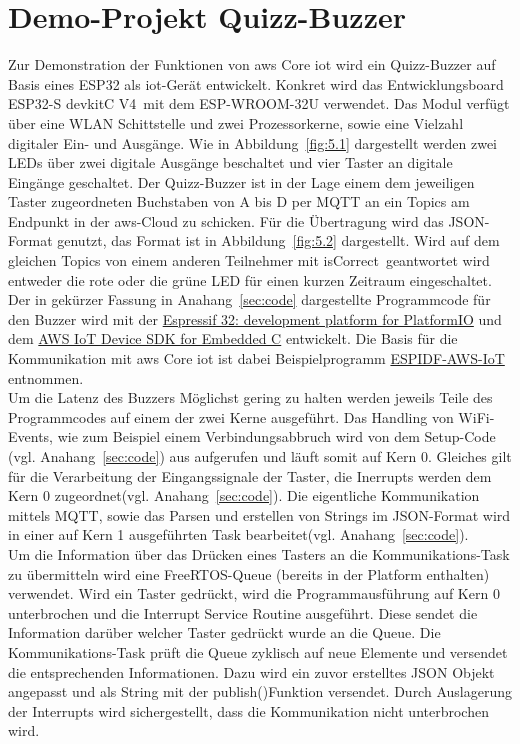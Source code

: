 \section{Demo-Projekt Quizz-Buzzer}\label{sec:5.2}
Zur Demonstration der Funktionen von \acrshort{aws} Core \acrshort{iot} wird ein Quizz-Buzzer auf Basis eines ESP32 als \acrshort{iot}-Gerät entwickelt. Konkret wird das Entwicklungsboard \glqq{}ESP32-S devkitC V4\grqq\ mit dem ESP-WROOM-32U verwendet. Das Modul verfügt über eine WLAN Schittstelle und zwei Prozessorkerne, sowie eine Vielzahl digitaler Ein- und Ausgänge. Wie in Abbildung~\ref*{fig:5.1} dargestellt werden zwei LEDs über zwei digitale Ausgänge beschaltet und vier Taster an digitale Eingänge geschaltet.
\FloatBarrier
Der Quizz-Buzzer ist in der Lage einem dem jeweiligen Taster zugeordneten Buchstaben von A bis D per MQTT an ein \Gls{Topics} am Endpunkt in der \acrshort{aws}-Cloud zu schicken. Für die Übertragung wird das JSON-Format genutzt, das Format ist in Abbildung~\ref*{fig:5.2} dargestellt. Wird auf dem gleichen \Gls{Topics} von einem anderen Teilnehmer mit \glqq{}isCorrect\grqq\ geantwortet wird entweder die rote oder die grüne LED für einen kurzen Zeitraum eingeschaltet.\\ Der in gekürzer Fassung in Anahang~\ref*{sec:code} dargestellte Programmcode für den Buzzer wird mit der \href{https://github.com/platformio/platform-espressif32/tree/master}{Espressif 32: development platform for PlatformIO} und dem \href{https://github.com/aws/aws-iot-device-sdk-embedded-C}{AWS IoT Device SDK for Embedded C} entwickelt. Die Basis für die Kommunikation mit \acrshort{aws} Core \acrshort{iot} ist dabei Beispielprogramm \href{https://github.com/platformio/platform-espressif32/tree/master/examples/espidf-aws-iot}{ESPIDF-AWS-IoT} entnommen.\\ Um die Latenz des Buzzers Möglichst gering zu halten werden jeweils Teile des Programmcodes auf einem der zwei Kerne ausgeführt. Das Handling von WiFi-Events, wie zum Beispiel einem Verbindungsabbruch wird von dem Setup-Code (vgl. Anahang~\ref*{sec:code}) aus aufgerufen und läuft somit auf Kern 0. Gleiches gilt für die Verarbeitung der Eingangssignale der Taster, die Inerrupts werden dem Kern 0 zugeordnet(vgl. Anahang~\ref*{sec:code}). Die eigentliche Kommunikation mittels MQTT, sowie das Parsen und erstellen von Strings im JSON-Format wird in einer auf Kern 1 ausgeführten Task bearbeitet(vgl. Anahang~\ref*{sec:code}).\\
Um die Information über das Drücken eines Tasters an die Kommunikations-Task zu übermitteln wird eine FreeRTOS-Queue (bereits in der Platform enthalten) verwendet. Wird ein Taster gedrückt, wird die Programmausführung auf Kern 0 unterbrochen und die Interrupt Service Routine ausgeführt. Diese sendet die Information darüber welcher Taster gedrückt wurde an die Queue. Die Kommunikations-Task prüft die Queue zyklisch auf neue Elemente und versendet die entsprechenden Informationen. Dazu wird ein zuvor erstelltes JSON Objekt angepasst und als String mit der \glqq{}publish()\grqq\-Funktion versendet. Durch Auslagerung der Interrupts wird sichergestellt, dass die Kommunikation nicht unterbrochen wird.\FloatBarrier